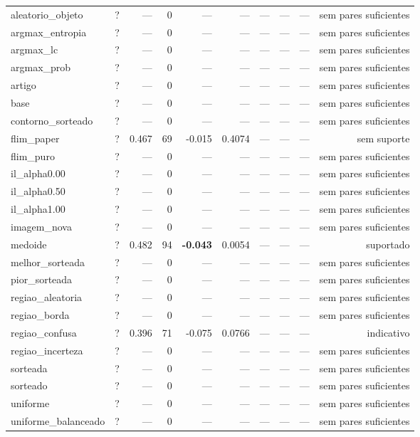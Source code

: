 \begin{tabular}{lrrrrrrrrr}
aleatorio\_objeto & ? & --- & 0 & --- & --- & --- & --- & --- & sem pares suficientes \\
argmax\_entropia & ? & --- & 0 & --- & --- & --- & --- & --- & sem pares suficientes \\
argmax\_lc & ? & --- & 0 & --- & --- & --- & --- & --- & sem pares suficientes \\
argmax\_prob & ? & --- & 0 & --- & --- & --- & --- & --- & sem pares suficientes \\
artigo & ? & --- & 0 & --- & --- & --- & --- & --- & sem pares suficientes \\
base & ? & --- & 0 & --- & --- & --- & --- & --- & sem pares suficientes \\
contorno\_sorteado & ? & --- & 0 & --- & --- & --- & --- & --- & sem pares suficientes \\
flim\_paper & ? & 0.467 & 69 & -0.015 & 0.4074 & --- & --- & --- & sem suporte \\
flim\_puro & ? & --- & 0 & --- & --- & --- & --- & --- & sem pares suficientes \\
il\_alpha0.00 & ? & --- & 0 & --- & --- & --- & --- & --- & sem pares suficientes \\
il\_alpha0.50 & ? & --- & 0 & --- & --- & --- & --- & --- & sem pares suficientes \\
il\_alpha1.00 & ? & --- & 0 & --- & --- & --- & --- & --- & sem pares suficientes \\
imagem\_nova & ? & --- & 0 & --- & --- & --- & --- & --- & sem pares suficientes \\
medoide & ? & 0.482 & 94 & \textbf{-0.043} & 0.0054 & --- & --- & --- & suportado \\
melhor\_sorteada & ? & --- & 0 & --- & --- & --- & --- & --- & sem pares suficientes \\
pior\_sorteada & ? & --- & 0 & --- & --- & --- & --- & --- & sem pares suficientes \\
regiao\_aleatoria & ? & --- & 0 & --- & --- & --- & --- & --- & sem pares suficientes \\
regiao\_borda & ? & --- & 0 & --- & --- & --- & --- & --- & sem pares suficientes \\
regiao\_confusa & ? & 0.396 & 71 & -0.075 & 0.0766 & --- & --- & --- & indicativo \\
regiao\_incerteza & ? & --- & 0 & --- & --- & --- & --- & --- & sem pares suficientes \\
sorteada & ? & --- & 0 & --- & --- & --- & --- & --- & sem pares suficientes \\
sorteado & ? & --- & 0 & --- & --- & --- & --- & --- & sem pares suficientes \\
uniforme & ? & --- & 0 & --- & --- & --- & --- & --- & sem pares suficientes \\
uniforme\_balanceado & ? & --- & 0 & --- & --- & --- & --- & --- & sem pares suficientes \\
\hline
\end{tabular}
